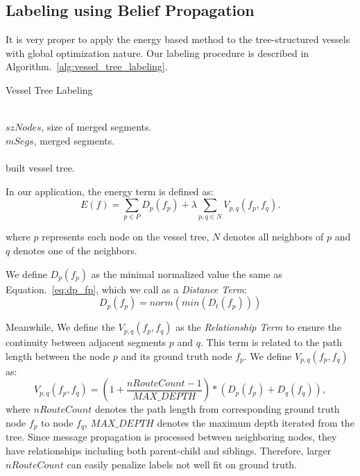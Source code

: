 \documentclass[journal]{IEEEtran}
\begin{document}
\subsection{Labeling using Belief Propagation}
\label{subsec:labeling-using-bp}
It is very proper to apply the energy based method to the tree-structured vessels with global optimization nature. Our labeling procedure is described in Algorithm.~\ref{alg:vessel_tree_labeling}.

\begin{algorithm}
  \caption{Vessel Tree Labeling}
  \label{alg:vessel_tree_labeling}
  \renewcommand{\algorithmicrequire}{\textbf{Input:}}
  \renewcommand{\algorithmicensure}{\textbf{Output:}}
  \begin{algorithmic}[]
  \Require ~~\\
    $szNodes$, size of merged segments.\\
    $mSegs$, merged segments.\\
  \Ensure ~~\\
    built vessel tree.
  \State

  \EndFunction
  \State
  \end{algorithmic}
\end{algorithm}

In our application, the energy term is defined as:
\begin{equation}
E(f) = \sum_{p\in P} D_{p}(f_{p}) + \lambda \sum_{p,q \in N} V_{p,q}(f_{p}, f_{q}).
\end{equation}

where $p$ represents each node on the vessel tree, $N$ denotes all neighbors of $p$ and $q$ denotes one of the neighbors.

We define $D_{p}(f_{p})$ as the minimal normalized value the same as Equation.~\ref{eq:dp_fp}, which we call as a \textit{Distance Term}:
\begin{equation}
D_{p}(f_{p}) = norm(min(D_{t}(f_{p})))
\end{equation}

Meanwhile, We define the $V_{p,q}(f_{p}, f_{q})$ as the \textit{Relationship Term} to ensure the continuity between adjacent segments $p$ and $q$. This term is related to the path length between the node $p$ and its ground truth node $f_{p}$. We define $V_{p,q}(f_{p}, f_{q})$ as:
\begin{equation}
V_{p,q}(f_{p}, f_{q}) = (1+\frac{nRouteCount-1}{MAX\_DEPTH})*(D_{p}(f_{p}) + D_{q}(f_{q})),
\end{equation}
where $nRouteCount$ denotes the path length from corresponding ground truth node $f_{p}$ to node $f_{q}$, $MAX\_DEPTH$ denotes the maximum depth iterated from the tree. Since message propagation is processed between neighboring nodes, they have relationships including both parent-child and siblings. Therefore, larger $nRouteCount$ can easily penalize labels not well fit on ground truth.
\end{document}
